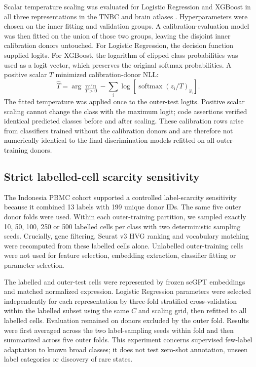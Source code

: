 Scalar temperature scaling was evaluated for Logistic Regression and XGBoost in all three representations in the TNBC and brain atlases \citep{Guo2017}. Hyperparameters were chosen on the inner fitting and validation groups. A calibration-evaluation model was then fitted on the union of those two groups, leaving the disjoint inner calibration donors untouched. For Logistic Regression, the decision function supplied logits. For XGBoost, the logarithm of clipped class probabilities was used as a logit vector, which preserves the original softmax probabilities. A positive scalar $T$ minimized calibration-donor NLL:
\begin{equation}
\hat{T}=\arg\min_{T>0}-\sum_i\log\left[\operatorname{softmax}(z_i/T)_{y_i}\right].
\end{equation}
The fitted temperature was applied once to the outer-test logits. Positive scalar scaling cannot change the class with the maximum logit; code assertions verified identical predicted classes before and after scaling. These calibration rows arise from classifiers trained without the calibration donors and are therefore not numerically identical to the final discrimination models refitted on all outer-training donors.

\subsection{Strict labelled-cell scarcity sensitivity}

The Indonesia PBMC cohort supported a controlled label-scarcity sensitivity because it combined 13 labels with 199 unique donor IDs. The same five outer donor folds were used. Within each outer-training partition, we sampled exactly 10, 50, 100, 250 or 500 labelled cells per class with two deterministic sampling seeds. Crucially, gene filtering, Seurat v3 HVG ranking and vocabulary matching were recomputed from these labelled cells alone. Unlabelled outer-training cells were not used for feature selection, embedding extraction, classifier fitting or parameter selection.

The labelled and outer-test cells were represented by frozen scGPT embeddings and matched normalized expression. Logistic Regression parameters were selected independently for each representation by three-fold stratified cross-validation within the labelled subset using the same $C$ and scaling grid, then refitted to all labelled cells. Evaluation remained on donors excluded by the outer fold. Results were first averaged across the two label-sampling seeds within fold and then summarized across five outer folds. This experiment concerns supervised few-label adaptation to known broad classes; it does not test zero-shot annotation, unseen label categories or discovery of rare states.

